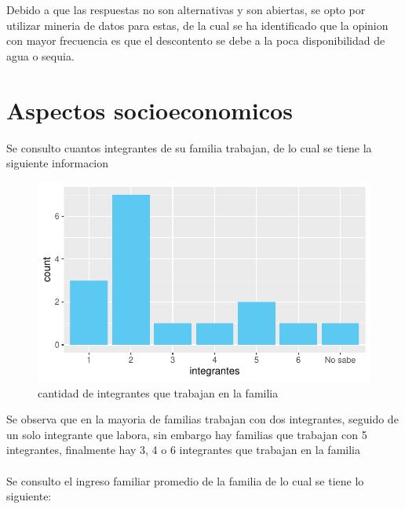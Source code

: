\documentclass[12pt]{article}\usepackage[]{graphicx}\usepackage[]{xcolor}
\makeatletter
\def\maxwidth{ %
  \ifdim\Gin@nat@width>\linewidth
    \linewidth
  \else
    \Gin@nat@width
  \fi
}
\newenvironment{knitrout}{}{} %
\makeatother
\begin{document}
	Debido a que las respuestas no son alternativas y son abiertas, se opto por utilizar mineria de datos para estas, de la cual se ha identificado que la opinion con mayor frecuencia es que el descontento se debe a la poca disponibilidad de agua o sequia.
	\section{Aspectos socioeconomicos}
	Se consulto cuantos integrantes de su familia trabajan, de lo cual se tiene la siguiente informacion
	\begin{figure}[H]
	\centering
\begin{knitrout}
\color{fgcolor}
\includegraphics[width=\maxwidth]{figure/diecinueve-1} 
\end{knitrout}
	\caption{cantidad de integrantes que trabajan en la familia}
	\end{figure}
	Se observa que en la mayoria de familias trabajan con dos integrantes, seguido de un solo integrante que labora, sin embargo hay familias que trabajan con 5 integrantes, finalmente hay 3, 4 o 6 integrantes que trabajan en la familia\\
	\\
  Se consulto el ingreso familiar promedio de la familia de lo cual se tiene lo siguiente:
\end{document}

